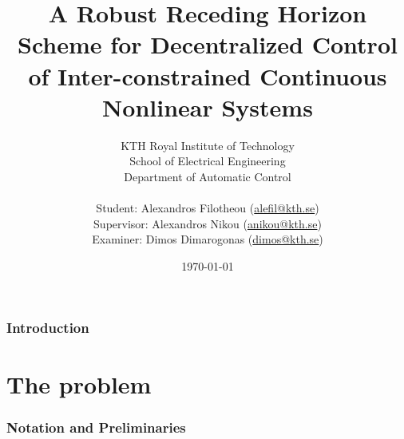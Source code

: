 \documentclass[a4paper,10pt,twoside]{article}
\title{\textbf{
A Robust Receding Horizon Scheme for Decentralized Control of Inter-constrained
Continuous Nonlinear Systems}}
\author{KTH Royal Institute of Technology \\
  School of Electrical Engineering \\
  Department of Automatic Control \\ \\
Student: Alexandros Filotheou (\href{mailto: alefil@kth.se}{alefil@kth.se}) \\
Supervisor: Alexandros Nikou (\href{mailto: anikou@kth.se}{anikou@kth.se}) \\
Examiner: Dimos Dimarogonas (\href{mailto: dimos@kth.se}{dimos@kth.se}) \\}
\date{\today}
\begin{document}
\maketitle


\cleardoublepage
\tableofcontents
\cleardoublepage


\section{Introduction}

  
  \cleardoublepage

\part{The problem}
\cleardoublepage

  \section{Notation and Preliminaries}
    \label{sec:notation_reliminaries}

    
    
    
    \cleardoublepage
\end{document}
